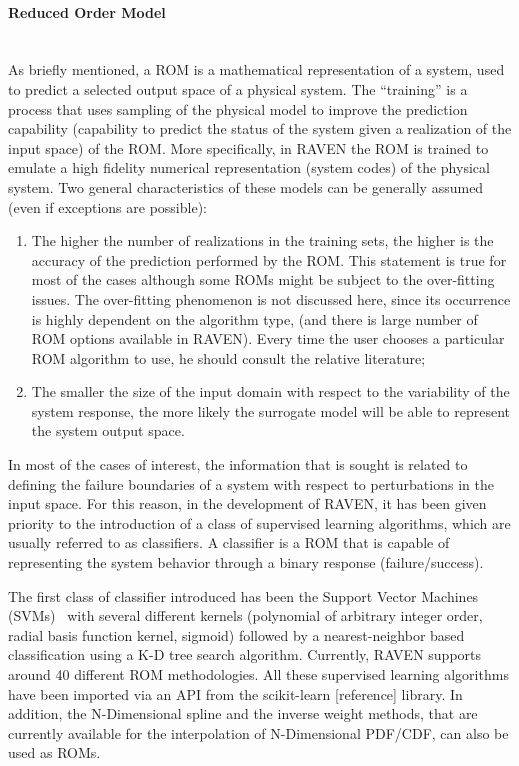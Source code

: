 \paragraph{Reduced Order Model} ~\\
 As briefly mentioned, a ROM is a mathematical representation of a system, used to predict a selected output space of a physical system. 
The ``training'' is a process that uses sampling of the physical model to improve the prediction capability (capability to predict the status of the system given a realization of the input space) of the ROM. More specifically, in RAVEN the ROM is trained to emulate a high fidelity numerical representation (system codes) of the physical system. Two general characteristics of these models can be generally assumed (even if exceptions are possible):
\begin{enumerate}
   \item The higher the number of realizations in the training sets, the higher is the accuracy of the prediction performed by the 
   ROM. This statement is true for most of the cases although some ROMs might be subject to the over-fitting issues. The over-fitting 
   phenomenon is not discussed here, since its occurrence is highly dependent on the algorithm type, (and there is large number of 
   ROM options available in RAVEN). Every time the user chooses a particular ROM algorithm to use, he should consult the relative 
   literature;
   \item The smaller the size of the input domain with respect to the variability of the system response, the more likely the surrogate 
   model will be able to represent the system output space.
\end{enumerate}

In most of the cases of interest, the information that is sought is related to defining the failure boundaries of a system with respect to perturbations in the input space. For this reason, in the development of RAVEN, it has been given priority to the introduction of a class of supervised learning algorithms, which are usually referred to as classifiers. A classifier is a ROM that is capable of representing the system behavior through a binary response (failure/success). 

The first class of classifier introduced has been the Support Vector Machines (SVMs)~\cite{} with several different kernels (polynomial of arbitrary integer order, radial basis function kernel, sigmoid) followed by a nearest-neighbor based classification using a K-D tree search algorithm. Currently, RAVEN supports around 40 different ROM methodologies. All these supervised learning algorithms have been imported via an API from the scikit-learn [reference] library. In addition, the N-Dimensional spline and the inverse weight methods, that are currently available for the interpolation of N-Dimensional PDF/CDF, can also be used as ROMs.


